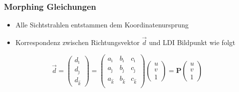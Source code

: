 \documentclass[aspectratio=169]{beamer}
\begin{document}
\begin{frame}
    \frametitle{Morphing Gleichungen}
    \begin{itemize}
        \item Alle Sichtstrahlen entstammen dem Koordinatenursprung
        \item Korrespondenz zwischen Richtungsvektor \( \vec{d} \) und LDI Bildpunkt wie folgt
    \end{itemize}

    \begin{equation}
        \vec{d} =
        \begin{pmatrix}
            d_{\hat{\imath}} \\
            d_{\hat{\jmath}} \\
            d_{\hat{k}}
        \end{pmatrix} =
        \begin{pmatrix}
            a_{\hat{\imath}} &
            b_{\hat{\imath}} &
            c_{\hat{\imath}}   \\
            a_{\hat{\jmath}} &
            b_{\hat{\jmath}} &
            c_{\hat{\jmath}}   \\
            a_{\hat{k}}      &
            b_{\hat{k}}      &
            c_{\hat{k}}        \\
        \end{pmatrix}
        \begin{pmatrix}
            u \\
            v \\
            1
        \end{pmatrix} =
        \mathbf{P}
        \begin{pmatrix}
            u \\
            v \\
            1
        \end{pmatrix}
    \end{equation}
\end{frame}
\end{document}
